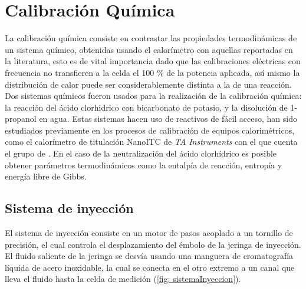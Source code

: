 
%




\chapter{Calibraci\'on Qu\'imica}\label{ch: chemical}
	La calibraci\'on qu\'imica consiste en contrastar las propiedades termodin\'amicas de un sistema qu\'imico, obtenidas usando el calor\'imetro con aquellas reportadas en la literatura, esto es de vital importancia dado que las calibraciones el\'ectricas con frecuencia no transfieren a la celda el 100 \% de la potencia aplicada, as\'i mismo la distribuci\'on de calor puede ser considerablemente distinta a la de una reacci\'on. Dos sistemas qu\'imicos fueron usados para la realizaci\'on de la calibraci\'on qu\'imica: la reacci\'on del \'acido clorhidrico con bicarbonato de potasio, y la disoluci\'on de 1-propanol en agua. Estas sistemas hacen uso de reactivos de f\'acil acceso, han sido estudiados previamente en los procesos de calibraci\'on de equipos calorim\'etricos, como el calor\'imetro de titulaci\'on NanoITC de \textit{TA Instruments} con el que cuenta el grupo de \groupname{} \cite{demarse2011calibration, adao2012chemical, nanoitc}. En el caso de la neutralizaci\'on del \'acido clorh\'idrico es posible obtener par\'ametros termodin\'amicos como la entalp\'ia de reacci\'on, entrop\'ia y energ\'ia libre de Gibbs.

\section{Sistema de inyecci\'on}
	El sistema de inyecci\'on consiste en un motor de pasos acoplado a un tornillo de precisión, el cual controla el desplazamiento del émbolo de la jeringa de inyección. El fluido saliente de la jeringa se desvía usando una manguera de cromatografía líquida de acero inoxidable, la cual se conecta en el otro extremo a un canal que lleva el fluido hasta la celda de medición (\autoref{fig: sistemaInyeccion}).
	
